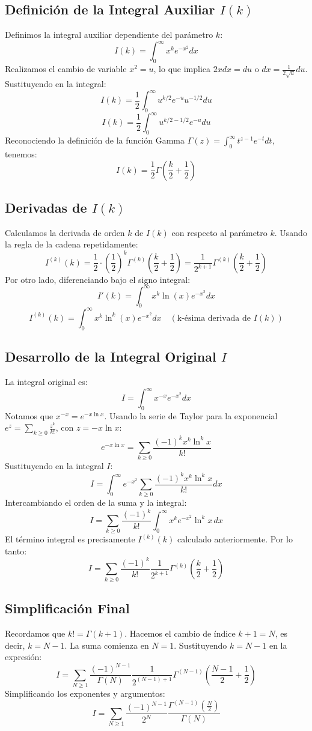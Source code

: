 \documentclass[a4paper]{article}
\begin{document}
\subsection{Definición de la Integral Auxiliar $I(k)$}
Definimos la integral auxiliar dependiente del parámetro $k$:
$$ I(k) = \int_{0}^{\infty} x^{k} e^{-x^2} dx $$
Realizamos el cambio de variable $x^2 = u$, lo que implica $2x dx = du$ o $dx = \frac{1}{2\sqrt{u}} du$. Sustituyendo en la integral:
$$ I(k) = \frac{1}{2} \int_{0}^{\infty} u^{k/2} e^{-u} u^{-1/2} du $$
$$ I(k) = \frac{1}{2} \int_{0}^{\infty} u^{k/2 - 1/2} e^{-u} du $$
Reconociendo la definición de la función Gamma $\Gamma(z) = \int_0^\infty t^{z-1} e^{-t} dt$, tenemos:
$$ I(k) = \frac{1}{2} \Gamma\left(\frac{k}{2} + \frac{1}{2}\right) $$

\subsection{Derivadas de $I(k)$}
Calculamos la derivada de orden $k$ de $I(k)$ con respecto al parámetro $k$. Usando la regla de la cadena repetidamente:
$$ I^{(k)}(k) = \frac{1}{2} \cdot \left(\frac{1}{2}\right)^k \Gamma^{(k)}\left(\frac{k}{2} + \frac{1}{2}\right) = \frac{1}{2^{k+1}} \Gamma^{(k)}\left(\frac{k}{2} + \frac{1}{2}\right) $$
Por otro lado, diferenciando bajo el signo integral:
$$ I'(k) = \int_{0}^{\infty} x^{k} \ln(x) e^{-x^2} dx $$
$$ I^{(k)}(k) = \int_{0}^{\infty} x^{k} \ln^k(x) e^{-x^2} dx \quad (\text{k-ésima derivada de } I(k)) $$

\subsection{Desarrollo de la Integral Original $I$}
La integral original es:
$$ I = \int_{0}^{\infty} x^{-x} e^{-x^2} dx $$
Notamos que $x^{-x} = e^{-x \ln x}$. Usando la serie de Taylor para la exponencial $e^z = \sum_{k \ge 0} \frac{z^k}{k!}$, con $z = -x \ln x$:
$$ e^{-x \ln x} = \sum_{k \ge 0} \frac{(-1)^k x^k \ln^k x}{k!} $$
Sustituyendo en la integral $I$:
$$ I = \int_{0}^{\infty} e^{-x^2} \sum_{k \ge 0} \frac{(-1)^k x^k \ln^k x}{k!} dx $$
Intercambiando el orden de la suma y la integral:
$$ I = \sum_{k \ge 0} \frac{(-1)^k}{k!} \int_{0}^{\infty} x^k e^{-x^2} \ln^k x \, dx $$
El término integral es precisamente $I^{(k)}(k)$ calculado anteriormente. Por lo tanto:
$$ I = \sum_{k \ge 0} \frac{(-1)^k}{k!} \frac{1}{2^{k+1}} \Gamma^{(k)}\left(\frac{k}{2} + \frac{1}{2}\right) $$

\subsection{Simplificación Final}
Recordamos que $k! = \Gamma(k+1)$. Hacemos el cambio de índice $k+1 = N$, es decir, $k = N-1$. La suma comienza en $N=1$.
Sustituyendo $k = N-1$ en la expresión:
$$ I = \sum_{N \ge 1} \frac{(-1)^{N-1}}{\Gamma(N)} \frac{1}{2^{(N-1)+1}} \Gamma^{(N-1)}\left(\frac{N-1}{2} + \frac{1}{2}\right) $$
Simplificando los exponentes y argumentos:
$$ I = \sum_{N \ge 1} \frac{(-1)^{N-1}}{2^N} \frac{\Gamma^{(N-1)}\left(\frac{N}{2}\right)}{\Gamma(N)} $$
\end{document}

